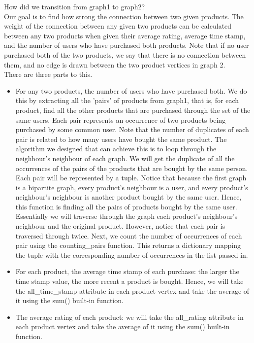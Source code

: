 \documentclass[fontsize=11pt]{article}
\begin{document}
How did we transition from graph1 to graph2? \\
 Our goal is to find how strong the connection between two given products. The weight of the connection between any given two products can be calculated between any two products when given their average rating, average time stamp, and the number of users who have purchased both products. Note that if no user purchased both of the two products, we say that there is no connection between them, and no edge is drawn between the two product vertices in graph 2. \\
There are three parts to this.
\begin{itemize}
    \item For any two products, the number of users who have purchased both. We do this by extracting all the 'pairs' of products from graph1, that is, for each product, find all the other products that are purchased through the set of the same users. Each pair represents an occurrence of two products being purchased by some common user. Note that the number of duplicates of each pair is related to how many users have bought the same product. The algorithm we designed that can achieve this is to loop through the neighbour's neighbour of each graph. We will get the duplicate of all the occurrences of the pairs of the products that are bought by the same person. Each pair will be represented by a tuple. Notice that because the first graph is a bipartite graph, every product's neighbour is a user, and every product's neighbour's neighbour is another product bought by the same user. Hence, this function is finding all the pairs of products bought by the same user. Essentially we will traverse through the graph each product's neighbour's neighbour and the original product. However, notice that each pair is traversed through twice. Next, we count the number of occurrences of each pair using the counting\_pairs function. This returns a dictionary mapping the tuple with the corresponding number of occurrences in the list passed in.
    \item For each product, the average time stamp of each purchase: the larger the time stamp value, the more recent a product is bought. Hence, we will take the all\_time\_stamp attribute in each product vertex and take the average of it using the sum() built-in function.
    \item The average rating of each product: we will take the all\_rating attribute in each product vertex and take the average of it using the sum() built-in function.
\end{itemize}\\
\end{document}
